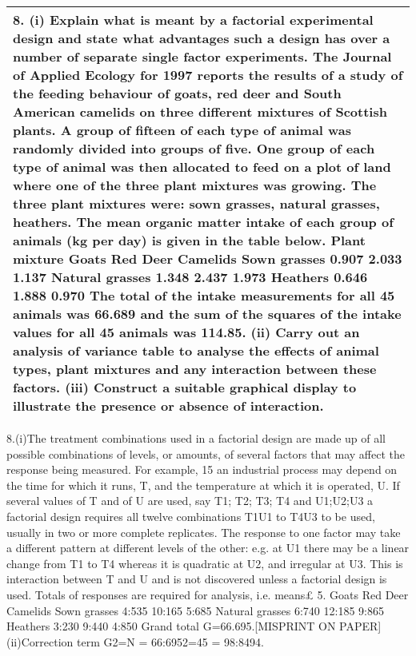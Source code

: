 \documentclass[a4paper,12pt]{article}
\begin{document}
\begin{table}[ht!]
 \centering
 \begin{tabular}{|p{15cm}|}
 \hline  
8. (i) Explain what is meant by a factorial experimental design and state what advantages such a design has over a number of separate single factor experiments.
The Journal of Applied Ecology for 1997 reports the results of a study of the feeding behaviour of goats, red deer and South American camelids on three different mixtures of Scottish plants. A group of fifteen  of each type of animal was randomly divided into groups of five. One group of each type of animal was then allocated to feed on  a plot of land where one of the three plant mixtures was growing. The three plant mixtures were:
 sown grasses, natural grasses, heathers. The mean organic matter intake of each group of animals (kg per day) is given in the table below.
Plant mixture Goats Red Deer Camelids Sown grasses 0.907 2.033 1.137 Natural grasses 1.348 2.437 1.973 Heathers 0.646 1.888 0.970
The total of the intake measurements  for all 45 animals was 66.689 and the sum of the squares of the intake values for all 45 animals was 114.85.
(ii) Carry out an analysis of variance table to analyse the effects of animal types, plant mixtures and any interaction between these factors.
(iii) Construct a suitable graphical display to illustrate the presence or absence of interaction.
\\ \hline
\end{tabular}
\end{table}
8.(i)The treatment combinations used in a factorial design are made up of all possible combinations
of levels, or amounts, of several factors that may affect the response being measured. For example,
15
an industrial process may depend on the time for which it runs, T, and the temperature at which it
is operated, U. If several values of T and of U are used, say T1; T2; T3; T4 and U1;U2;U3 a factorial
design requires all twelve combinations T1U1 to T4U3 to be used, usually in two or more complete
replicates.
The response to one factor may take a different pattern at different levels of the other: e.g. at
U1 there may be a linear change from T1 to T4 whereas it is quadratic at U2, and irregular at U3.
This is interaction between T and U and is not discovered unless a factorial design is used.
Totals of responses are required for analysis, i.e. means£ 5.
Goats Red Deer Camelids
Sown grasses 4:535 10:165 5:685
Natural grasses 6:740 12:185 9:865
Heathers 3:230 9:440 4:850
Grand total G=66.695.[MISPRINT ON PAPER]
(ii)Correction term G2=N = 66:6952=45 = 98:8494.
\end{document}

